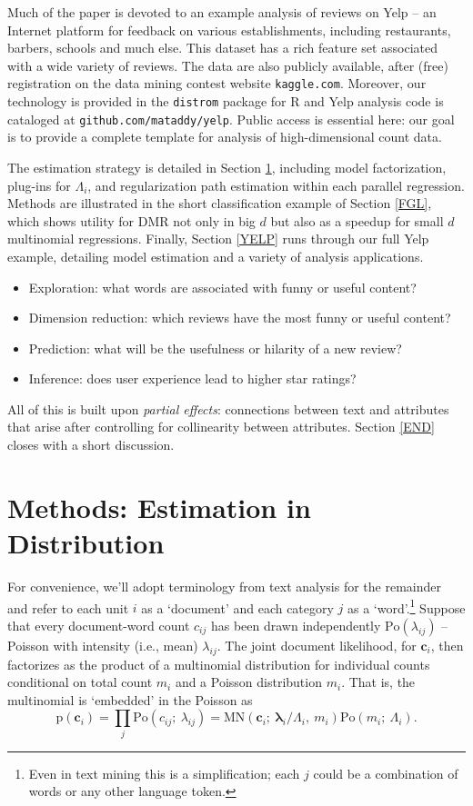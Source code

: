 \documentclass[12pt]{article}
\newcommand{\sgl}{\setstretch{1.1}}
\newcommand{\bs}[1]{\boldsymbol{#1}}
\newcommand{\mr}[1]{\mathrm{#1}}
\newcommand{\bm}[1]{\mathbf{#1}}
\newcommand{\cd}[1]{{\tt#1}}
\begin{document}
Much of the paper is devoted to an example analysis of reviews on Yelp -- an
Internet platform for feedback on various establishments, including
restaurants, barbers, schools and much else.  This dataset has a rich feature
set associated with a wide variety of reviews. The data are also publicly
available, after (free) registration on the data mining contest website
\cd{kaggle.com}. 
Moreover, our technology is provided in the \cd{distrom} package for R and
 Yelp analysis code is cataloged at \cd{github.com/mataddy/yelp}.  Public
access is essential here: our goal is to provide a
complete template for analysis of high-dimensional count data.

The estimation strategy is detailed in Section \ref{methods}, including model
factorization, plug-ins for $\Lambda_i$, and regularization
path estimation within each parallel regression. Methods
are illustrated in the short classification example of Section
\ref{FGL}, which shows utility for DMR not only in
big $d$ but also as a speedup for small $d$ multinomial regressions. Finally,
Section \ref{YELP} runs through our full Yelp example, detailing model
estimation and a variety of analysis applications.
\begin{itemize}\sgl
\item 
Exploration: what words are associated with funny or useful content?
\item Dimension reduction: which reviews have the most funny or useful content?
\item Prediction: what will be the usefulness or hilarity of a new review? 
\item Inference: does user experience lead to higher star ratings?
\end{itemize}
All of this is built upon {\it partial effects}:  connections
between text and attributes that arise  after controlling for
collinearity between attributes.  Section \ref{END} closes with a short
discussion.


\section{Methods: Estimation in Distribution}
\label{methods}

For convenience, we'll adopt terminology from text analysis for the remainder
and refer to each unit $i$ as a `document' and each category $j$ as a
`word'.\footnote{Even in text mining this is a simplification; each $j$ could
be a combination of words or any other language token.} Suppose that every
document-word count $c_{ij}$ has been drawn independently
$\mr{Po}\left(\lambda_{ij}\right)$ -- Poisson with intensity (i.e., mean)
$\lambda_{ij}$. The joint document likelihood, for $\bm{c}_i$, then factorizes as the
product of a multinomial distribution for  individual counts conditional on
 total count $m_i$ and a Poisson distribution $m_i$.
That is, the multinomial is `embedded' in the Poisson as
\begin{equation}\label{embed} \mr{p}(\bm{c}_{i}) = \prod_j
\mr{Po}\left(c_{ij};~\lambda_{ij}\right) =
\mr{MN}\left(\bm{c}_i;~\bs{\lambda}_{i}/\Lambda_i,
~m_i\right)\mr{Po}\left(m_i;~\Lambda_i\right). 
\end{equation}
\end{document}
